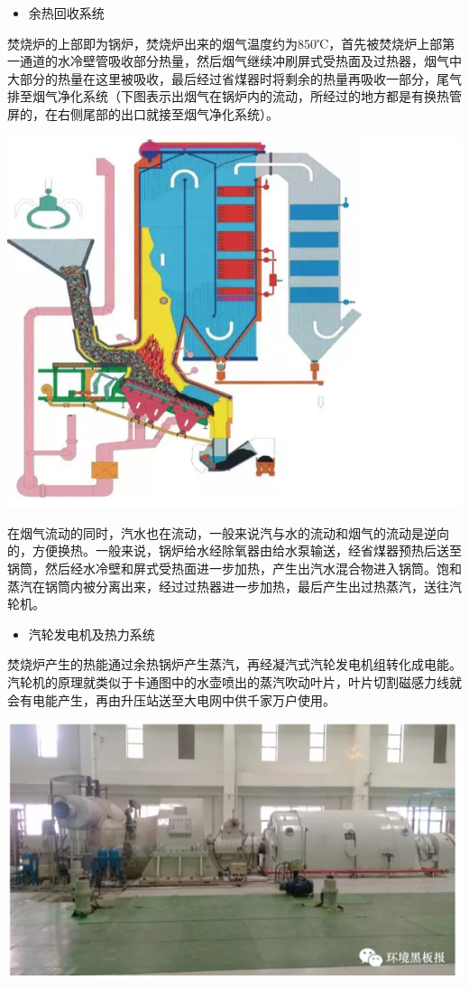 \documentclass[]{book}
\providecommand{\tightlist}{%
  \setlength{\itemsep}{0pt}\setlength{\parskip}{0pt}}
\begin{document}
\begin{itemize}
\tightlist
\item
  余热回收系统
\end{itemize}

焚烧炉的上部即为锅炉，焚烧炉出来的烟气温度约为850℃，首先被焚烧炉上部第一通道的水冷壁管吸收部分热量，然后烟气继续冲刷屏式受热面及过热器，烟气中大部分的热量在这里被吸收，最后经过省煤器时将剩余的热量再吸收一部分，尾气排至烟气净化系统（下图表示出烟气在锅炉内的流动，所经过的地方都是有换热管屏的，在右侧尾部的出口就接至烟气净化系统）。

\includegraphics[width=8.33in]{images/ljfs5}

在烟气流动的同时，汽水也在流动，一般来说汽与水的流动和烟气的流动是逆向的，方便换热。一般来说，锅炉给水经除氧器由给水泵输送，经省煤器预热后送至锅筒，然后经水冷壁和屏式受热面进一步加热，产生出汽水混合物进入锅筒。饱和蒸汽在锅筒内被分离出来，经过过热器进一步加热，最后产生出过热蒸汽，送往汽轮机。

\begin{itemize}
\tightlist
\item
  汽轮发电机及热力系统
\end{itemize}

焚烧炉产生的热能通过余热锅炉产生蒸汽，再经凝汽式汽轮发电机组转化成电能。汽轮机的原理就类似于卡通图中的水壶喷出的蒸汽吹动叶片，叶片切割磁感力线就会有电能产生，再由升压站送至大电网中供千家万户使用。

\includegraphics[width=8.33in]{images/ljfs6}
\end{document}
